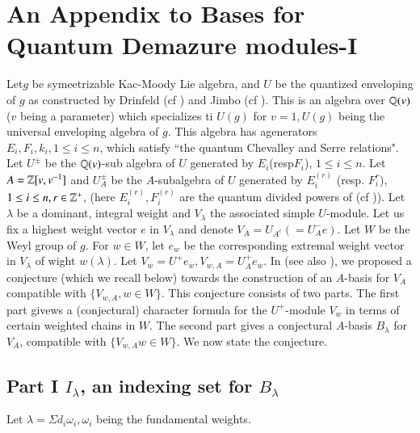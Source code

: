 \chapter{An Appendix to Bases for Quantum Demazure modules-I}\label{chap10}


\setcounter{pageoriginal}{220}
Let\pageoriginale $g$ be symeetrizable Kac-Moody Lie algebra, and $U$ be the quantized enveloping of $g$ as constructed by Drinfeld (cf \cite{chap10-keyD}) and Jimbo (cf \cite{chap10-keyJ}). This is an algebra over $\mathbb{Q}(v)$ ($v$ being a parameter) which specializes ti $U(g)$ for $v=1, U(g)$ being the universal enveloping algebra of $g$. This algebra has agenerators $E_{i}, F_{i}, k_{i}, 1 \leq i \leq n$, which satisfy ``the quantum Chevalley and Serre relations". Let $U^{\pm}$ be the $\mathbb{Q}(v)$-sub algebra of $U$ generated by $E_{i}$(resp$F_{i}$), $1 \leq i \leq n$. Let $A = \mathbb{Z}[v, v^{-1}]$ and $U_{A}^{\pm}$ be the $A$-subalgebra of $U$ generated by $E_{i}^{(r)}$ (resp. $F_{i}^{r}$), $1 \leq i \leq n, r \in \mathbb{Z}^{+}$, (here $E_{i}^{(r)}, F_{i}^{(r)}$ are the quantum divided powers of (cf \cite{chap10-keyJ})). Let $\lambda$ be a dominant, integral weight and $V_{\lambda}$ the associated simple $U$-module. Let us fix a highest weight vector $e$ in $V_{\lambda}$ and denote $V_{A}=U_{A^{e}}(=U_{A}^{-}e)$. Let $W$ be the Weyl group of $g$. For $w \in W$, let $e_{w}$ be the corresponding extremal weight vector in $V_{\lambda}$ of wight $w(\lambda)$. Let $V_{w} = U^{+}e_{w}, V_{w, A} = U_{A}^{+}e_{w}$. In \cite{chap10-keyLa} (see also \cite{chap10-keyLS}), we proposed a conjecture (which we recall below) towards the construction of an $A$-basis for $V_{A}$ compatible with $\{V_{w, A}, w \in W\}$. This conjecture consists of two parts. The first part givews a (conjectural) character formula for the  $U^{+}$-module $V_{w}$ in terms of certain weighted chains in $W$. The second part gives a conjectural $A$-basis $B_{\lambda}$ for $V_{A}$, compatible with
 $\{V_{w, A} w \in W \}$. We now state the conjecture.  

\section*{Part I \boldmath$I_{\lambda}$, an indexing set for $B_{\lambda}$}
Let $\lambda = \Sigma d_{i}\omega_{i}, \omega_{i}$ being the fundamental weights.

